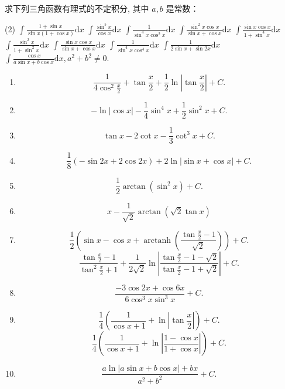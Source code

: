\begin{exercise}[4.2.2]
    求下列三角函数有理式的不定积分, 其中 $a, b$ 是常数：

    \begin{tasks}(2)
        \task $\displaystyle \int \frac{1 + \sin x}{\sin x (1 + \cos x)}\mathrm{d}x$
        \task $\displaystyle \int \frac{\sin^5 x}{\cos x}\mathrm{d}x$
        \task $\displaystyle \int \frac{1}{\sin^4 x \cos^2 x}\mathrm{d}x$
        \task $\displaystyle \int \frac{\sin^2 x \cos x}{\sin x + \cos x}\mathrm{d}x$
        \task $\displaystyle \int \frac{\sin x \cos x}{1 + \sin^4 x}\mathrm{d}x$
        \task $\displaystyle \int \frac{\sin^2 x}{1 + \sin^2 x}\mathrm{d}x$
        \task $\displaystyle \int \frac{\sin x \cos x}{\sin x + \cos x}\mathrm{d}x$
        \task $\displaystyle \int \frac{1}{\sin^4 x \cos^4 x}\mathrm{d}x$
        \task $\displaystyle \int \frac{1}{2 \sin x + \sin 2x}\mathrm{d}x$
        \task $\displaystyle \int \frac{\cos x}{a \sin x + b \cos x}\mathrm{d}x, a^2 + b^2 \neq 0.$
    \end{tasks}
\end{exercise}

\begin{solution}
    \begin{enumerate}
        \item $$\frac{1}{4\cos^2 \frac{x}{2}} + \tan \frac{x}{2} + \frac{1}{2} \ln \left| \tan \frac{x}{2} \right| + C.$$
        \item $$-\ln|\cos x| - \frac{1}{4}\sin^4 x + \frac{1}{2}\sin^2 x + C.$$
        \item $$\tan x - 2 \cot x - \frac{1}{3} \cot^3 x + C.$$
        \item $$\frac{1}{8}(-\sin 2x + 2 \cos 2x) + 2 \ln |\sin x + \cos x| + C.$$
        \item $$\frac{1}{2} \arctan (\sin^2 x) + C.$$
        \item $$x - \frac{1}{\sqrt 2} \arctan \left( \sqrt{2} \tan x\right)$$
        \item $$\frac{1}{2}\left( \sin x - \cos x + \operatorname{arctanh} \left( \frac{\tan \frac{x}{2} -1 }{\sqrt{2}} \right) \right) + C.$$
              $$\frac{\tan \frac{x}{2} - 1}{\tan^2 \frac{x}{2} + 1} + \frac{1}{2\sqrt{2}} \ln \left| \frac{\tan \frac{x}{2} - 1 - \sqrt{2}}{\tan \frac{x}{2} - 1 + \sqrt{2}} \right| + C.$$
        \item $$\frac{-3 \cos 2x + \cos 6x}{6 \cos^3 x \sin^3 x} + C.$$
        \item $$\frac{1}{4} \left( \frac{1}{\cos x + 1} + \ln \left| \tan \frac{x}{2} \right| \right) + C.$$
        $$\frac{1}{4} \left( \frac{1}{\cos x + 1} + \ln \left| \frac{1-\cos x}{1+\cos x} \right| \right) + C.$$
        \item $$\frac{a \ln|a \sin x + b \cos x| + bx}{a^2 + b^2} + C.$$
    \end{enumerate}
\end{solution}

\newpage

